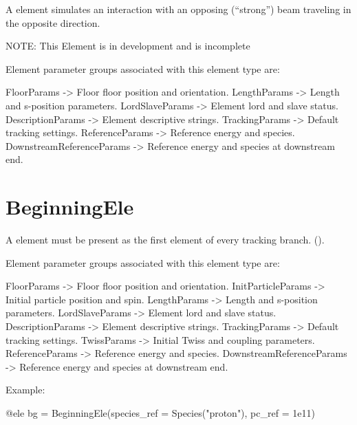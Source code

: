 A  element simulates an interaction with an opposing
(``strong'') beam traveling in the opposite direction.

NOTE: This Element is in development and is incomplete

Element parameter groups associated with this element type are:
\TOPrule
\begin{example}
  FloorParams -> Floor floor position and orientation.  
  LengthParams        -> Length and s-position parameters.  
  LordSlaveParams     -> Element lord and slave status.  
  DescriptionParams   -> Element descriptive strings.  
  TrackingParams      -> Default tracking settings.  
  ReferenceParams     -> Reference energy and species. 
  DownstreamReferenceParams -> Reference energy and species at downstream end. 
\end{example}
\BOTTOMrule


\newpage

\section{BeginningEle}
\label{s:begin.ele}

A  element must be present as the first element of every tracking branch.
().

Element parameter groups associated with this element type are:
\TOPrule
\begin{example}
  FloorParams -> Floor floor position and orientation.  
  InitParticleParams  -> Initial particle position and spin.  
  LengthParams        -> Length and s-position parameters.  
  LordSlaveParams     -> Element lord and slave status.  
  DescriptionParams   -> Element descriptive strings.  
  TrackingParams      -> Default tracking settings.  
  TwissParams         -> Initial Twiss and coupling parameters.  
  ReferenceParams     -> Reference energy and species. 
  DownstreamReferenceParams -> Reference energy and species at downstream end. 
\end{example}
\BOTTOMrule


Example:
\begin{example}
  @ele bg = BeginningEle(species_ref = Species("proton"), pc_ref = 1e11)
\end{example}

